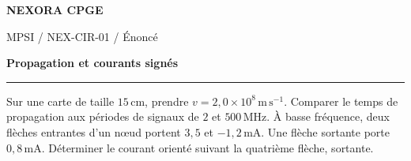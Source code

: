 \documentclass[11pt,a4paper]{article}
\begin{document}
{\small\bfseries\color{nexorablue} NEXORA CPGE}\par
{\small MPSI / NEX-CIR-01 / Énoncé}\par
{\LARGE\bfseries Propagation et courants signés}\par
\vspace{0.25em}\hrule\vspace{0.6em}

Sur une carte de taille $15\,\mathrm{cm}$, prendre $v=2{,}0\times10^8\,\mathrm{m\,s^{-1}}$. Comparer le temps de propagation aux périodes de signaux de $2$ et $500\,\mathrm{MHz}$. À basse fréquence, deux flèches entrantes d’un nœud portent $3{,}5$ et $-1{,}2\,\mathrm{mA}$. Une flèche sortante porte $0{,}8\,\mathrm{mA}$. Déterminer le courant orienté suivant la quatrième flèche, sortante.
\end{document}
